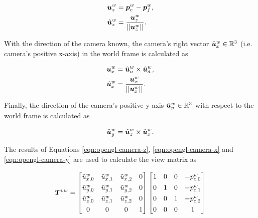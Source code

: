 \begin{align}
	\bm{u}^w_z&=\bm{p}^w_c-\bm{p}^w_f,\\
	\hat{\bm{u}}^w_z&=\frac{\bm{u}^w_z}{||\bm{u}^w_z||}.
	\label{eqn:opengl-camera-z}
\end{align}

With the direction of the camera known, the camera's right vector $\hat{\bm{u}}^w_x\in\mathbb{R}^3$ (i.e. camera's positive x-axis) in the world frame is calculated as

\begin{align}
	\bm{u}^w_x&=\hat{\bm{u}}^w_u\times\hat{\bm{u}}^w_d,\\
	\hat{\bm{u}}^w_x&=\frac{\bm{u}^w_x}{||\bm{u}^w_x||}.
	\label{eqn:opengl-camera-x}
\end{align}

Finally, the direction of the camera's positive y-axis $\hat{\bm{u}}^w_y\in\mathbb{R}^3$ with respect to the world frame is calculated as

\begin{equation}
	\hat{\bm{u}}^w_y=\hat{\bm{u}}^w_z\times\hat{\bm{u}}^w_x.
	\label{eqn:opengl-camera-y}
\end{equation}

The results of Equations \ref{eqn:opengl-camera-z}, \ref{eqn:opengl-camera-x} and \ref{eqn:opengl-camera-y} are used to calculate the view matrix as

\begin{equation}
	\renewcommand*{\arraystretch}{1.3}
	\matr{T}^{vw}=
	\begin{bmatrix}
		\hat{u}^w_{x,0} & \hat{u}^w_{x,1} & \hat{u}^w_{x,2} & 0 \\
		\hat{u}^w_{y,0} & \hat{u}^w_{y,1} & \hat{u}^w_{y,2} & 0 \\
		\hat{u}^w_{z,0} & \hat{u}^w_{z,1} & \hat{u}^w_{z,2} & 0 \\
		0 & 0 & 0 & 1
	\end{bmatrix}
	\begin{bmatrix}
		1 & 0 & 0 & -p^w_{c,0} \\
		0 & 1 & 0 & -p^w_{c,1} \\
		0 & 0 & 1 & -p^w_{c,2} \\
		0 & 0 & 0 & 1
	\end{bmatrix}
\end{equation}

